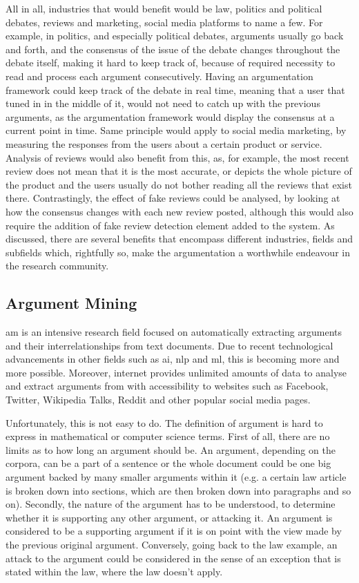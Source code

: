      All in all, industries that would benefit would be law, politics and political debates, reviews and marketing, social media platforms to name a few. For example, in politics, and especially political debates, arguments usually go back and forth, and the consensus of the issue of the debate changes throughout the debate itself, making it hard to keep track of, because of required necessity to read and process each argument consecutively. Having an argumentation framework could keep track of the debate in real time, meaning that a user that tuned in in the middle of it, would not need to catch up with the previous arguments, as the argumentation framework would display the consensus at a current point in time. Same principle would apply to social media marketing, by measuring the responses from the users about a certain product or service. Analysis of reviews would also benefit from this, as, for example, the most recent review does not mean that it is the most accurate, or depicts the whole picture of the product and the users usually do not bother reading all the reviews that exist there. Contrastingly, the effect of fake reviews could be analysed, by looking at how the consensus changes with each new review posted, although this would also require the addition of fake review detection element added to the system. As discussed, there are several benefits that encompass different industries, fields and subfields which, rightfully so, make the argumentation a worthwhile endeavour in the research community.
     
    \subsection{Argument Mining}
     \gls{am} is an intensive research field focused on automatically extracting arguments and their interrelationships from text documents. Due to recent technological advancements in other fields such as \gls{ai}, \gls{nlp} and \gls{ml}, this is becoming more and more possible. Moreover, internet provides unlimited amounts of data to analyse and extract arguments from with accessibility to websites such as Facebook, Twitter, Wikipedia Talks, Reddit and other popular social media pages.
     
     Unfortunately, this is not easy to do. The definition of argument is hard to express in mathematical or computer science terms. First of all, there are no limits as to how long an argument should be. An argument, depending on the corpora, can be a part of a sentence or the whole document could be one big argument backed by many smaller arguments within it (e.g. a certain law article is broken down into sections, which are then broken down into paragraphs and so on). Secondly, the nature of the argument has to be understood, to determine whether it is supporting any other argument, or attacking it. An argument is considered to be a supporting argument if it is on point with the view made by the previous original argument. Conversely, going back to the law example, an attack to the argument could be considered in the sense of an exception that is stated within the law, where the law doesn't apply. 
     

